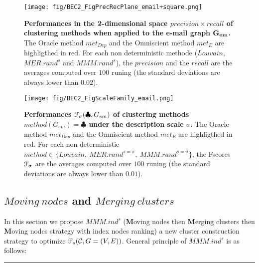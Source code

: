 \documentclass[12pt]{article}
\theoremstyle{thmstyleone}%
\theoremstyle{definition}
\begin{document}
\newpage
\begin{figure}[h!] \centering
     \texttt{[image: fig/BEC2\_FigPrecRecPlane\_email+square.png]}
 \caption{{\bf Performances in the $\bf 2$-dimensional space $precision \times recall$ of clustering methods when applied to the e-mail graph $\bf G_{em}$.} The Oracle method $met_{Dep}$ and the Omniscient method $met_E$ are highligthed in red.
 For each non deterministic methode ($Louvain$, $MER.rand^{s}$ and $MMM.rand^{s}$),
    the $precision$ and the $recall$ are the averages computed over $100$ runing (the standard deviations are always lower than $0.02$).
    \label{FigPrecRecPlane_email}}
 \end{figure}

\begin{figure}[h!] \centering
     \texttt{[image: fig/BEC2\_FigScaleFamily\_email.png]}
\caption{{\bf Performances $\EuScript{F}_{\sigma}(\clubsuit,G_{em})$ of clustering methods
$method(G_{em})=\clubsuit$ under the description scale $\sigma$.}
The Oracle method $met_{Dep}$ and the Omniscient method $met_E$ are highligthed in red.
 For each non deterministic $method \in \{Louvain,~MER.rand^{s=\sigma},~ MMM.rand^{s=\sigma}\}$,
    the Fscores $\EuScript{F}_{\sigma}$ are the averages computed over $100$ runing (the standard deviations are always lower than $0.01$).
    \label{FigScaleFamily_email}}
\end{figure}
\newpage

\subsection{$Moving~nodes$ and $Merging~clusters$}
In this section we propose $MMM.ind^{s}$ ({\bf M}oving nodes then  {\bf M}erging clusters then {\bf M}oving nodes strategy with index nodes ranking)
a new cluster construction strategy to optimize $\EuScript{F}_{s}(\mathcal{C},G=(V,E))$. General principle of $MMM.ind^{s}$ is as follows:

\newpage
\noindent
\rule{16cm}{0.05cm}
\end{document}
